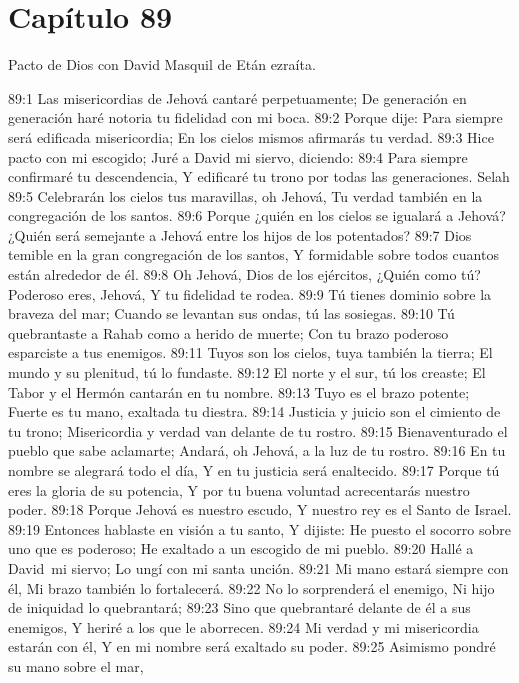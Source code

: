 \section*{Capítulo 89}
Pacto de Dios con David 
Masquil de Etán ezraíta. 
 
89:1 Las misericordias de Jehová cantaré perpetuamente; 
De generación en generación haré notoria tu fidelidad con mi boca. 
89:2 Porque dije: Para siempre será edificada misericordia; 
En los cielos mismos afirmarás tu verdad. 
89:3 Hice pacto con mi escogido; 
Juré a David mi siervo, diciendo: 
89:4 Para siempre confirmaré tu descendencia, 
Y edificaré tu trono por todas las generaciones.  Selah 
89:5 Celebrarán los cielos tus maravillas, oh Jehová, 
Tu verdad también en la congregación de los santos. 
89:6 Porque ¿quién en los cielos se igualará a Jehová? 
¿Quién será semejante a Jehová entre los hijos de los potentados? 
89:7 Dios temible en la gran congregación de los santos, 
Y formidable sobre todos cuantos están alrededor de él. 
89:8 Oh Jehová, Dios de los ejércitos, 
¿Quién como tú? Poderoso eres, Jehová, 
Y tu fidelidad te rodea. 
89:9 Tú tienes dominio sobre la braveza del mar; 
Cuando se levantan sus ondas, tú las sosiegas. 
89:10 Tú quebrantaste a Rahab como a herido de muerte; 
Con tu brazo poderoso esparciste a tus enemigos. 
89:11 Tuyos son los cielos, tuya también la tierra; 
El mundo y su plenitud, tú lo fundaste. 
89:12 El norte y el sur, tú los creaste; 
El Tabor y el Hermón cantarán en tu nombre. 
89:13 Tuyo es el brazo potente; 
Fuerte es tu mano, exaltada tu diestra. 
89:14 Justicia y juicio son el cimiento de tu trono; 
Misericordia y verdad van delante de tu rostro. 
89:15 Bienaventurado el pueblo que sabe aclamarte; 
Andará, oh Jehová, a la luz de tu rostro. 
89:16 En tu nombre se alegrará todo el día, 
Y en tu justicia será enaltecido. 
89:17 Porque tú eres la gloria de su potencia, 
Y por tu buena voluntad acrecentarás nuestro poder. 
89:18 Porque Jehová es nuestro escudo, 
Y nuestro rey es el Santo de Israel. 
89:19 Entonces hablaste en visión a tu santo, 
Y dijiste: He puesto el socorro sobre uno que es poderoso; 
He exaltado a un escogido de mi pueblo. 
89:20 Hallé a David mi siervo; 
Lo ungí con mi santa unción. 
89:21 Mi mano estará siempre con él, 
Mi brazo también lo fortalecerá. 
89:22 No lo sorprenderá el enemigo, 
Ni hijo de iniquidad lo quebrantará; 
89:23 Sino que quebrantaré delante de él a sus enemigos, 
Y heriré a los que le aborrecen. 
89:24 Mi verdad y mi misericordia estarán con él, 
Y en mi nombre será exaltado su poder. 
89:25 Asimismo pondré su mano sobre el mar, 
